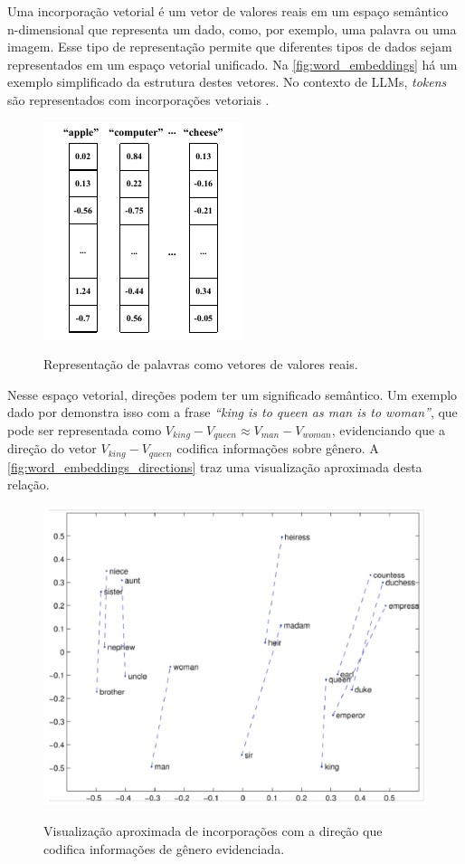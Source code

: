 Uma incorporação vetorial é um vetor de valores reais em um espaço semântico n-dimensional que representa um dado, como, por exemplo, uma palavra ou uma imagem. Esse
tipo de representação permite que diferentes tipos de dados sejam representados em um espaço vetorial unificado. Na \autoref{fig:word_embeddings} há um exemplo
simplificado da estrutura destes vetores. No contexto de \acp{LLM}, \textit{tokens} são representados com incorporações vetoriais \cite{word_embedding, mllm_survey_2023}.

\begin{figure}[ht]
      \centering
      \caption{\small Representação de palavras como vetores de valores reais.}
      \includegraphics[width=0.3\columnwidth,keepaspectratio]{images/word_embeddings.pdf}
      \label{fig:word_embeddings}
\end{figure}

Nesse espaço vetorial, direções podem ter um significado semântico. Um exemplo dado por \textcite{glove} demonstra isso com a frase \textit{``king is to queen as man is
      to woman''}, que pode ser representada como \begin{math}V_{king} - V_{queen} \approx V_{man} - V_{woman}\end{math}, evidenciando que a direção do vetor
\begin{math}V_{king} - V_{queen}\end{math} codifica informações sobre gênero. A \autoref{fig:word_embeddings_directions} traz uma visualização aproximada desta relação.

\begin{figure}[ht]
      \centering
      \caption{\small Visualização aproximada de incorporações com a direção que codifica informações de gênero evidenciada.}
      \includegraphics[width=0.6\columnwidth,keepaspectratio]{images/word_embeddings_directions.png}
      \label{fig:word_embeddings_directions}
\end{figure}

